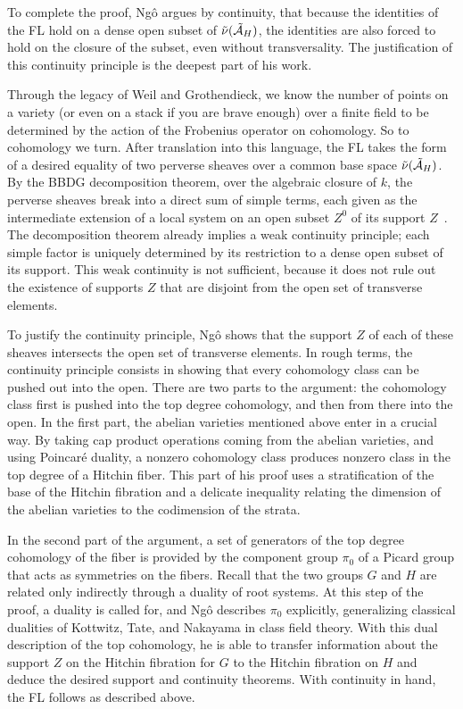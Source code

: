 To complete the proof, Ng\^o argues by continuity, that because the
identities of the FL hold on a dense open subset of
$\tilde\nu(\tilde\AA_H)$, the identities are also forced to hold on the
closure of the subset, even without transversality.  The justification
of this continuity principle is the deepest part of his work.

Through the legacy of Weil and Grothendieck, we know the number of
points on a variety (or even on a stack if you are brave enough) over
a finite field to be determined by the action of the Frobenius operator on
cohomology. So to cohomology we turn.  After translation into this
language, the FL takes the form of a desired equality of two perverse
sheaves over a common base space $\tilde\nu(\tilde\AA_H)$.  By the
BBDG decomposition theorem, over the algebraic closure of $k$, the
perverse sheaves break into a direct sum of simple terms, each given
as the intermediate extension of a local system on an open subset
$Z^0$ of its support $Z$~\cite{BBDG:1982}.  The decomposition theorem
already implies a weak continuity principle; each simple factor is
uniquely determined by its restriction to a dense open subset of its
support.  This weak continuity is not sufficient, because it does not
rule out the existence of supports $Z$ that are disjoint from the open
set of transverse elements.

To justify the continuity principle, Ng\^o shows that the support $Z$ of
each of these sheaves intersects the open set of transverse elements.
In rough terms, the continuity principle consists in showing that
every cohomology class can be pushed out into the open.  There are two
parts to the argument: the cohomology class first is pushed into the
top degree cohomology, and then from there into the open.  In the
first part, the abelian varieties mentioned above enter in a crucial
way.  By taking cap product operations coming from the abelian
varieties, and using Poincar\'e duality, a nonzero cohomology class
produces nonzero class in the top degree of a Hitchin fiber.  This
part of his proof uses a stratification of the base of the Hitchin
fibration and a delicate inequality relating the dimension of the
abelian varieties to the codimension of the strata.  

In the second part of the argument, a set of generators of the top degree cohomology of the fiber is
provided by the component group $\pi_0$ of a Picard group that acts as
symmetries on the fibers.  Recall that the two groups $G$ and
$H$ are related only indirectly through a duality of root systems.  At
this step of the proof, a duality is called for, and Ng\^o describes
$\pi_0$ explicitly, generalizing 
classical dualities of Kottwitz, Tate, and Nakayama in class field
theory.  With this dual description of the top cohomology, he is able
to transfer information about the support $Z$ on the Hitchin fibration
for $G$ to the Hitchin fibration on $H$ and deduce the desired support
and continuity theorems.  With continuity in hand, the FL follows as described above.  

